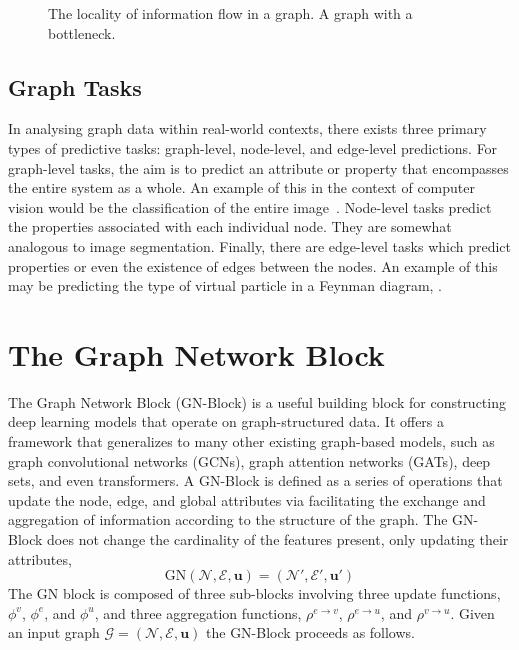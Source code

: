 \begin{figure}
\begin{subfigure}[b]{0.3\textwidth}
        \caption{}
        \label{fig:bottleneck}
    \end{subfigure}
    \caption{ The locality of information flow in a graph.  A graph with a bottleneck.}
    \label{fig:over_squashing}
\end{figure}

\subsection{Graph Tasks}

In analysing graph data within real-world contexts, there exists three primary types of predictive tasks: graph-level, node-level, and edge-level predictions.
For graph-level tasks, the aim is to predict an attribute or property that encompasses the entire system as a whole.
An example of this in the context of computer vision would be the classification of the entire image~.
Node-level tasks predict the properties associated with each individual node.
They are somewhat analogous to image segmentation.
Finally, there are edge-level tasks which predict  properties or even the existence of edges between the nodes.
An example of this may be predicting the type of virtual particle in a Feynman diagram, .

\section{The Graph Network Block}
\label{sec:gn_block}

The Graph Network Block (GN-Block) is a useful building block for constructing deep learning models that operate on graph-structured data.
It offers a framework that generalizes to many other existing graph-based models, such as graph convolutional networks (GCNs), graph attention networks (GATs), deep sets, and even transformers.
A GN-Block is defined as a series of operations that update the node, edge, and global attributes via facilitating the exchange and aggregation of information according to the structure of the graph.
The GN-Block does not change the cardinality of the features present, only updating their attributes,
\begin{equation}
    \text{GN}(\mathcal{N}, \mathcal{E}, \mathbf{u}) = (\mathcal{N}', \mathcal{E}', \mathbf{u}')
\end{equation}
The GN block is composed of three sub-blocks involving three update functions, $\phi^v$, $\phi^e$, and $\phi^u$, and three aggregation functions, $\rho^{e \to v}$, $\rho^{e \to u}$, and $\rho^{v \to u}$.
Given an input graph $\mathcal{G} = (\mathcal{N}, \mathcal{E}, \mathbf{u})$ the GN-Block proceeds as follows.

